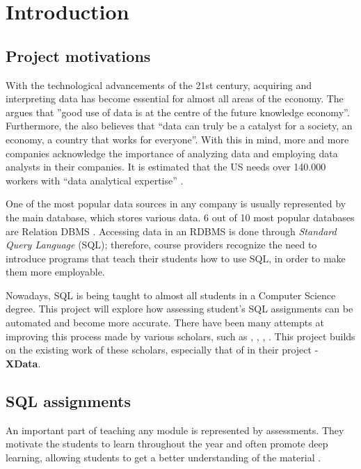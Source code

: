\chapter{Introduction} \label{ch:introduction}
\section{Project motivations}
With the technological advancements of the 21st century, acquiring and interpreting
data has become essential for almost all areas of the economy. The \cite{ec:big_data} argues that ''good use of data is at
the centre of the future knowledge economy''.
Furthermore, the \cite{gov:big_data} also believes that ``data can truly be a catalyst for a society, an economy, a country that works for everyone''. With this in mind, more and more companies acknowledge the importance of analyzing data and employing data analysts in their companies. It is estimated that the US needs over 140.000 workers with ``data analytical expertise'' \citep{Lohr2012}.

One of the most popular data sources in any company is usually represented by the main database, which stores various data. 6 out of 10 most popular databases are Relation DBMS \citep{db_engine:statistics}.
Accessing data in an RDBMS is done through \textit{Standard Query Language}
(SQL); therefore, course providers recognize the need to introduce programs that teach their students how to use SQL, in order to make them more employable.

Nowadays, SQL is being taught to almost all students in a Computer Science
degree. This project will explore how assessing student's SQL
assignments can be automated and become more accurate. There have been many attempts at improving this process made by various scholars, such as \cite{literature:activesql}, \cite{literature:assesql},
\cite{literature:sqlify}, \cite{literature:xdata}. This project builds on the existing work of these scholars, especially that of \cite{literature:xdata} in their project - \textbf{XData}.

\section{SQL assignments} \label{ch:introduction:assignments}

An important part of teaching any module is represented by assessments. They motivate the students to learn throughout the year and often promote deep learning, allowing students to get a better understanding of the material \citep{literature:assement}.

